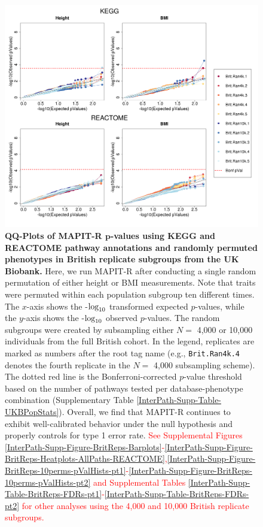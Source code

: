 \documentclass[10pt]{article}
\def\log{{\rm log}}
\begin{document}
\begin{figure}[htbp]
\centering
\includegraphics[width=\textwidth]{Images/Supp/InterPath_Supp_Figure_BritReps_perm1_QQPlots_AllPaths_vs1.png}
\caption{\textbf{QQ-Plots of MAPIT-R $\bm{p}$-values using KEGG and REACTOME pathway annotations and randomly permuted phenotypes in British replicate subgroups from the UK Biobank.} Here, we run MAPIT-R after conducting a single random permutation of either height or BMI measurements. Note that traits were permuted within each population subgroup ten different times. The $x$-axis shows the -$\log_{10}$ transformed expected $p$-values, while the $y$-axis shows the -$\log_{10}$ observed $p$-values. The random subgroups were created by subsampling either $N =$ 4,000 or 10,000 individuals from the full British cohort. In the legend, replicates are marked as numbers after the root tag name (e.g., \texttt{Brit.Ran4k.4} denotes the fourth replicate in the $N =$ 4,000 subsampling scheme). The dotted red line is the Bonferroni-corrected $p$-value threshold based on the number of pathways tested per database-phenotype combination (Supplementary Table \ref{InterPath-Supp-Table-UKBPopStats}). Overall, we find that MAPIT-R continues to exhibit well-calibrated behavior under the null hypothesis and properly controls for type 1 error rate. \textcolor{red}{See Supplemental Figures \ref{InterPath-Supp-Figure-BritReps-Barplots}-\ref{InterPath-Supp-Figure-BritReps-Heatplots-AllPaths-REACTOME},\ref{InterPath-Supp-Figure-BritReps-10perms-pValHists-pt1}-\ref{InterPath-Supp-Figure-BritReps-10perms-pValHists-pt2} and Supplemental Tables \ref{InterPath-Supp-Table-BritReps-FDRs-pt1}-\ref{InterPath-Supp-Table-BritReps-FDRs-pt2} for other analyses using the 4,000 and 10,000 British replicate subgroups.}}
\label{InterPath-Supp-Figure-BritReps-perm1-QQPlots-AllPaths}
\end{figure}
\clearpage
\end{document}
